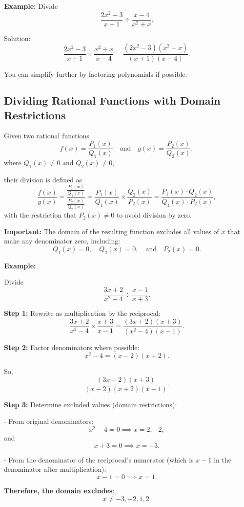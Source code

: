 \documentclass[11pt]{article}
\begin{document}
\bigskip

\textbf{Example:} Divide
\[
\frac{2x^2 - 3}{x + 1} \div \frac{x - 4}{x^2 + x}.
\]

Solution:
\[
\frac{2x^2 - 3}{x + 1} \times \frac{x^2 + x}{x - 4} = \frac{(2x^2 - 3)(x^2 + x)}{(x + 1)(x - 4)}.
\]

You can simplify further by factoring polynomials if possible.

\subsection{Dividing Rational Functions with Domain Restrictions}

Given two rational functions
\[
f(x) = \frac{P_1(x)}{Q_1(x)} \quad \text{and} \quad g(x) = \frac{P_2(x)}{Q_2(x)},
\]
where \(Q_1(x) \neq 0\) and \(Q_2(x) \neq 0\),

their division is defined as
\[
\frac{f(x)}{g(x)} = \frac{\frac{P_1(x)}{Q_1(x)}}{\frac{P_2(x)}{Q_2(x)}} = \frac{P_1(x)}{Q_1(x)} \times \frac{Q_2(x)}{P_2(x)} = \frac{P_1(x) \cdot Q_2(x)}{Q_1(x) \cdot P_2(x)},
\]
with the restriction that \(P_2(x) \neq 0\) to avoid division by zero.

\bigskip

\textbf{Important:} The domain of the resulting function excludes all values of \(x\) that make any denominator zero, including:
\[
Q_1(x) = 0, \quad Q_2(x) = 0, \quad \text{and} \quad P_2(x) = 0.
\]

\bigskip

\textbf{Example:}

Divide
\[
\frac{3x + 2}{x^2 - 4} \div \frac{x - 1}{x + 3}.
\]

\textbf{Step 1:} Rewrite as multiplication by the reciprocal:
\[
\frac{3x + 2}{x^2 - 4} \times \frac{x + 3}{x - 1} = \frac{(3x + 2)(x + 3)}{(x^2 - 4)(x - 1)}.
\]

\textbf{Step 2:} Factor denominators where possible:
\[
x^2 - 4 = (x - 2)(x + 2).
\]

So,
\[
\frac{(3x + 2)(x + 3)}{(x - 2)(x + 2)(x - 1)}.
\]

\textbf{Step 3:} Determine excluded values (domain restrictions):

- From original denominators:
\[
x^2 - 4 = 0 \implies x = 2, -2,
\]
and
\[
x + 3 = 0 \implies x = -3.
\]

- From the denominator of the reciprocal’s numerator (which is \(x-1\) in the denominator after multiplication):
\[
x - 1 = 0 \implies x = 1.
\]

\textbf{Therefore, the domain excludes}:
\[
x \neq -3, -2, 1, 2.
\]
\end{document}
